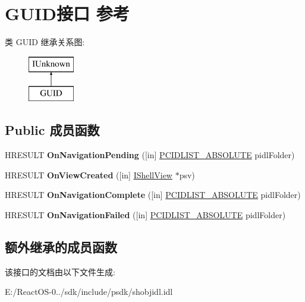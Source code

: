 \hypertarget{interface_g_u_i_d}{}\section{G\+U\+I\+D接口 参考}
\label{interface_g_u_i_d}
类 G\+U\+ID 继承关系图\+:\begin{figure}[H]
\begin{center}
\leavevmode
\includegraphics[height=2.000000cm]{interface_g_u_i_d}
\end{center}
\end{figure}
\subsection*{Public 成员函数}
\begin{DoxyCompactItemize}
\item 
\mbox{\label{interface_g_u_i_d_a2d666a2cf7dba332b7058f76386ee0da}} 
H\+R\+E\+S\+U\+LT {\bfseries On\+Navigation\+Pending} (\mbox{[}in\mbox{]} \hyperlink{struct___i_t_e_m_i_d_l_i_s_t___a_b_s_o_l_u_t_e}{P\+C\+I\+D\+L\+I\+S\+T\+\_\+\+A\+B\+S\+O\+L\+U\+TE} pidl\+Folder)
\item 
\mbox{\label{interface_g_u_i_d_a701b47e5fd16b17a8fff1b3464fff13d}} 
H\+R\+E\+S\+U\+LT {\bfseries On\+View\+Created} (\mbox{[}in\mbox{]} \hyperlink{interface_i_shell_view}{I\+Shell\+View} $\ast$psv)
\item 
\mbox{\label{interface_g_u_i_d_a03fcad6b9cd327944b79f5a2277cbce8}} 
H\+R\+E\+S\+U\+LT {\bfseries On\+Navigation\+Complete} (\mbox{[}in\mbox{]} \hyperlink{struct___i_t_e_m_i_d_l_i_s_t___a_b_s_o_l_u_t_e}{P\+C\+I\+D\+L\+I\+S\+T\+\_\+\+A\+B\+S\+O\+L\+U\+TE} pidl\+Folder)
\item 
\mbox{\label{interface_g_u_i_d_a42268cf313ce1692687e9093573606fa}} 
H\+R\+E\+S\+U\+LT {\bfseries On\+Navigation\+Failed} (\mbox{[}in\mbox{]} \hyperlink{struct___i_t_e_m_i_d_l_i_s_t___a_b_s_o_l_u_t_e}{P\+C\+I\+D\+L\+I\+S\+T\+\_\+\+A\+B\+S\+O\+L\+U\+TE} pidl\+Folder)
\end{DoxyCompactItemize}
\subsection*{额外继承的成员函数}


该接口的文档由以下文件生成\+:\begin{DoxyCompactItemize}
\item 
E\+:/\+React\+O\+S-\/0../sdk/include/psdk/shobjidl.\+idl\end{DoxyCompactItemize}
